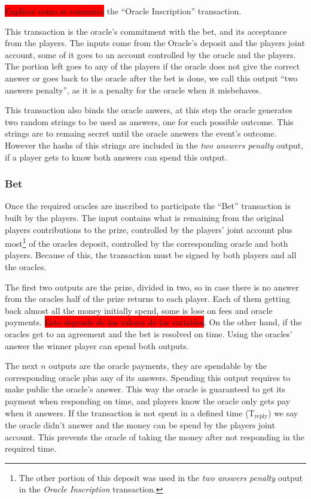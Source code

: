   \colorbox{red}{Explicar como se comunica} the ``Oracle Inscription''
  transaction.


This transaction is the oracle's commitment with the bet, and its acceptance
  from the players. The inputs come from the Oracle's deposit and the players
  joint account, some of it goes to an account controlled by the oracle and
  the players.
The portion left goes to any of the players if the oracle does not give the
  correct answer or goes back to the oracle after the bet is done, we call
  this output ``two answers penalty'', as it is a penalty for the oracle
  when it misbehaves.

This transaction also binds the oracle anwers, at this step the oracle generates
  two random strings to be used as answers, one for each possible outcome.
This strings are to remaing secret until the oracle answers the event's
  outcome.
However the hashs of this strings are included in the \textit{two answers
  penalty} output, if a player gets to know both answers can spend this output.

\subsubsection{Bet}

Once the required oracles are inscribed to participate the ``Bet'' transaction
  is built by the players.
 The input contains what is remaining from the original players contributions to
   the prize, controlled by the players' joint account plus most\footnote{The
  other portion of this deposit was used in the \textit{two answers penalty}
  output in the \textit{Oracle Inscription} transaction.} of the oracles
  deposit, controlled by the corresponding oracle and both players.
Because of this, the transaction must be signed by both players and all the
  oracles.

The first two outputs are the prize, divided in two, so in case there is no
  answer from the oracles half of the prize returns to each player.
Each of them getting back almost all the money initially spend, some is lose
  on fees and oracle payments. \colorbox{red}{Esto depende de los valores de
  las variables}. On the other hand, if the oracles get to an agreement and the
  bet is resolved on time. Using the oracles' answer the winner player can spend
  both outputs.

The next $n$ outputs are the oracle payments, they are spendable by the
  corresponding oracle plus any of its answers.
Spending this output requires to make public the oracle's answer. This way the
  oracle is guaranteed to get its payment when responding on time, and players
  know the oracle only gets pay when it answers.
  If the transaction is not spent in a defined time (T$_{\text{reply}}$) we say
  the oracle didn't answer and the money can be spend by the players joint
  account.
This prevents the oracle of taking the money after not responding in the
  required time.

